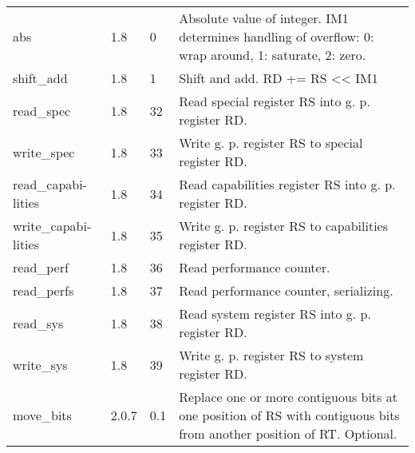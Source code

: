 \documentclass[forwardcom.tex]{subfiles}
\begin{document}
\begin{longtable} {|p{20mm}|p{10mm}|p{8mm}|p{75mm}|}
abs           & 1.8   &  0  & Absolute value of integer. IM1 determines handling of overflow: 0: wrap around, 1: saturate, 2: zero. \\
shift\_add    & 1.8   &  1  & Shift and add. RD += RS \textless\textless{} IM1 \\
read\_spec    & 1.8   & 32  & Read special register RS into g. p. register RD. \\
write\_spec   & 1.8   & 33  & Write g. p. register RS to special register RD. \\
read\_capabi-lities & 1.8   & 34  & Read capabilities register RS into g. p. register RD. \\
write\_capabi-lities & 1.8   & 35  & Write g. p. register RS to capabilities register RD. \\
read\_perf    & 1.8   & 36  & Read performance counter. \\
read\_perfs   & 1.8   & 37  & Read performance counter, serializing. \\
read\_sys     & 1.8   & 38  & Read system register RS into g. p. register RD. \\
write\_sys    & 1.8   & 39  & Write g. p. register RS to system register RD. \\

move\_bits    & 2.0.7 & 0.1 & Replace one or more contiguous bits at one position of RS with contiguous bits from another position of RT. Optional. \\


\end{longtable}
\end{document}
